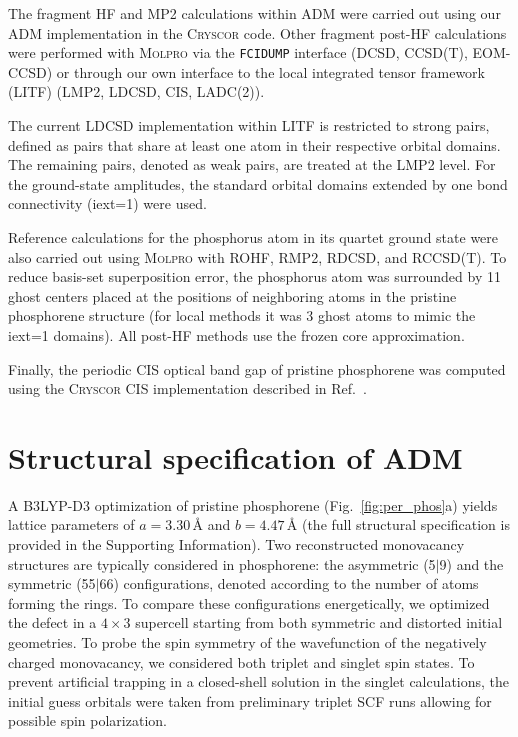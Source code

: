 \documentclass[aip,jcp,reprint]{revtex4-2}
\begin{document}
The fragment HF and MP2 calculations within ADM were carried out using our ADM implementation in the \textsc{Cryscor} code. Other fragment post-HF calculations were performed with \textsc{Molpro} via the \texttt{FCIDUMP} interface\cite{Knowles1989_FCIDUMP} (DCSD, CCSD(T), EOM-CCSD) or through our own interface to the local integrated tensor framework (LITF)\cite{Kats_LITF} (LMP2, LDCSD, CIS, LADC(2)). 

The current LDCSD implementation within LITF is restricted to strong pairs, defined as pairs that share at least one atom in their respective orbital domains. The remaining pairs, denoted as weak pairs, are treated at the LMP2 level. For the ground-state amplitudes, the standard orbital domains extended by one bond connectivity (iext=1) were used.

Reference calculations for the phosphorus atom in its quartet ground state were also carried out using \textsc{Molpro} with ROHF,\cite{Roothaan1960_ROHF} RMP2,\cite{Pople1976_RMP2} RDCSD,\cite{RDCSD_ref} and RCCSD(T).\cite{RCCSDT} To reduce basis-set superposition error, the phosphorus atom was surrounded by 11 ghost centers placed at the positions of neighboring atoms in the pristine phosphorene structure (for local methods it was 3 ghost atoms to mimic the iext=1 domains). All post-HF methods use the frozen core approximation.


Finally, the periodic CIS optical band gap of pristine phosphorene was computed using the \textsc{Cryscor} CIS implementation described in Ref.~.



\section{Structural specification of ADM}

A B3LYP-D3 optimization of pristine phosphorene (Fig.~\ref{fig:per_phos}a) yields lattice parameters of $a=3.30\,\text{\AA}$ and $b=4.47\,\text{\AA}$ (the full structural specification is provided in the Supporting Information). Two reconstructed monovacancy structures are typically considered in phosphorene: the asymmetric (5$|$9) and the symmetric (55$|$66) configurations, denoted according to the number of atoms forming the rings. To compare these configurations energetically, we optimized the defect in a $4\times3$ supercell starting from both symmetric and distorted initial geometries. To probe the spin symmetry of the wavefunction of the negatively charged monovacancy, we considered both triplet and singlet spin states. To prevent artificial trapping in a closed-shell solution in the singlet calculations, the initial guess orbitals were taken from preliminary triplet SCF runs allowing for possible spin polarization.
\end{document}
